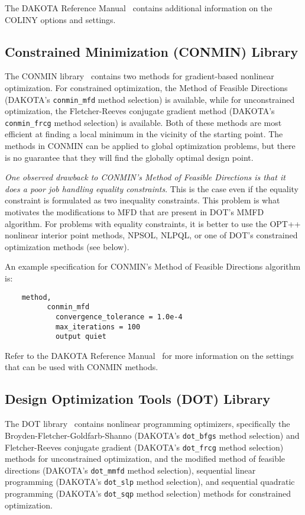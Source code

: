 The DAKOTA Reference Manual~\cite{RefMan} contains additional information
on the COLINY options and settings.

\subsection{Constrained Minimization (CONMIN) Library}\label{opt:software:conmin}

The CONMIN library~\cite{Van78} contains two methods for gradient-based
nonlinear optimization. For constrained optimization, the Method of
Feasible Directions (DAKOTA's \texttt{conmin\_mfd} method selection)
is available, while for unconstrained optimization, the
Fletcher-Reeves conjugate gradient method (DAKOTA's
\texttt{conmin\_frcg} method selection) is available. Both of these
methods are most efficient at finding a local minimum in the vicinity
of the starting point. The methods in CONMIN can be applied to global
optimization problems, but there is no guarantee that they will find
the globally optimal design point.

\emph{One observed drawback to CONMIN's Method of Feasible Directions
is that it does a poor job handling equality constraints}. This is the
case even if the equality constraint is formulated as two inequality
constraints. This problem is what motivates the modifications to MFD
that are present in DOT's MMFD algorithm. For problems with equality
constraints, it is better to use the OPT++ nonlinear interior point
methods, NPSOL, NLPQL, or one of DOT's constrained optimization
methods (see below).

An example specification for CONMIN's Method of Feasible Directions
algorithm is:
\begin{small}
\begin{verbatim}
    method,
          conmin_mfd
            convergence_tolerance = 1.0e-4
            max_iterations = 100
            output quiet
\end{verbatim}
\end{small}

Refer to the DAKOTA Reference Manual~\cite{RefMan} for more information on
the settings that can be used with CONMIN methods.

\subsection{Design Optimization Tools (DOT) Library}\label{opt:software:dot}

The DOT library~\cite{Van95} contains nonlinear programming optimizers,
specifically the Broyden-Fletcher-Goldfarb-Shanno (DAKOTA's
\texttt{dot\_bfgs} method selection) and Fletcher-Reeves conjugate
gradient (DAKOTA's \texttt{dot\_frcg} method selection) methods for
unconstrained optimization, and the modified method of feasible
directions (DAKOTA's \texttt{dot\_mmfd} method selection), sequential
linear programming (DAKOTA's \texttt{dot\_slp} method selection), and
sequential quadratic programming (DAKOTA's \texttt{dot\_sqp} method
selection) methods for constrained optimization.

